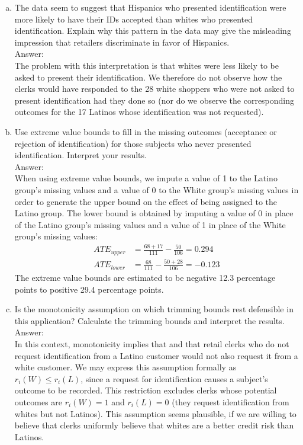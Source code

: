 \documentclass[11pt,notitlepage]{article}\usepackage[]{graphicx}\usepackage[]{color}
\begin{document}
\begin{enumerate}[a)]
\item The data seem to suggest that Hispanics who presented identification were more likely to have their IDs accepted than whites who presented identification. Explain why this pattern in the data may give the misleading impression that retailers discriminate in favor of Hispanics.\\
Answer:\\
The problem with this interpretation is that whites were less likely to be asked to present their identification.  We therefore do not observe how the clerks would have responded to the 28 white shoppers who were not asked to present identification had they done so (nor do we observe the corresponding outcomes for the 17 Latinos whose identification was not requested).
\item Use extreme value bounds to fill in the missing outcomes (acceptance or rejection of identification) for those subjects who never presented identification. Interpret your results. \\
Answer:\\
When using extreme value bounds, we impute a value of 1 to the Latino group's missing values and a value of 0 to the White group's missing values in order to generate the upper bound on the effect of being assigned to the Latino group. The lower bound is obtained by imputing a value of 0 in place of the Latino group's missing values and a value of 1 in place of the White group's missing values:
\begin{align*}
ATE_{upper} &= \frac{68+17}{111} - \frac{50}{106} = 0.294\\
ATE_{lower} &= \frac{68}{111} - \frac{50+28}{106} = -0.123
\end{align*}
The extreme value bounds are estimated to be negative 12.3 percentage points to positive 29.4 percentage points.

\item Is the monotonicity assumption on which trimming bounds rest defensible in this application? Calculate the trimming bounds and interpret the results. \\
Answer:\\
In this context, monotonicity implies that and that retail clerks who do not request identification from a Latino customer would not also request it from a white customer. We may express this assumption formally as $r_i(W)\leq r_i(L)$, since a request for identification causes a subject's outcome to be recorded. This restriction excludes clerks whose potential outcomes are $r_i(W)=1$ and $r_i(L)=0$ (they request identification from whites but not Latinos). This assumption seems plausible, if we are willing to believe that clerks uniformly believe that whites are a better credit risk than Latinos.


\end{enumerate}
\end{document}
